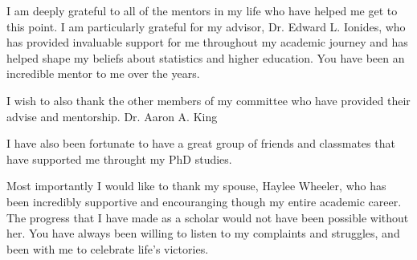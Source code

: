 I am deeply grateful to all of the mentors in my life who have helped me get to this point.
I am particularly grateful for my advisor, Dr. Edward L. Ionides, who has provided invaluable support for me throughout my academic journey and has helped shape my beliefs about statistics and higher education.
You have been an incredible mentor to me over the years.

I wish to also thank the other members of my committee who have provided their advise and mentorship. 
Dr. Aaron A. King 

I have also been fortunate to have a great group of friends and classmates that have supported me throught my PhD studies.

Most importantly I would like to thank my spouse, Haylee Wheeler, who has been incredibly supportive and encouranging though my entire academic career.
The progress that I have made as a scholar would not have been possible without her.
You have always been willing to listen to my complaints and struggles, and been with me to celebrate life's victories.

